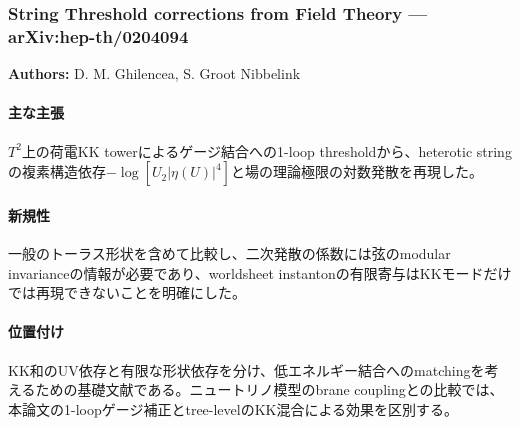 \subsubsection{String Threshold corrections from Field Theory --- arXiv:hep-th/0204094}

\textbf{Authors:} D. M. Ghilencea, S. Groot Nibbelink

\paragraph{主な主張}
$T^2$上の荷電KK towerによるゲージ結合への1-loop thresholdから、heterotic stringの複素構造依存$-\log[U_2|\eta(U)|^4]$と場の理論極限の対数発散を再現した\cite{Ghilencea:2002StringThresholds}。

\paragraph{新規性}
一般のトーラス形状を含めて比較し、二次発散の係数には弦のmodular invarianceの情報が必要であり、worldsheet instantonの有限寄与はKKモードだけでは再現できないことを明確にした。

\paragraph{位置付け}
KK和のUV依存と有限な形状依存を分け、低エネルギー結合へのmatchingを考えるための基礎文献である。ニュートリノ模型のbrane couplingとの比較では、本論文の1-loopゲージ補正とtree-levelのKK混合による効果\cite{Dudas:2005ClassicalRunning}を区別する。

